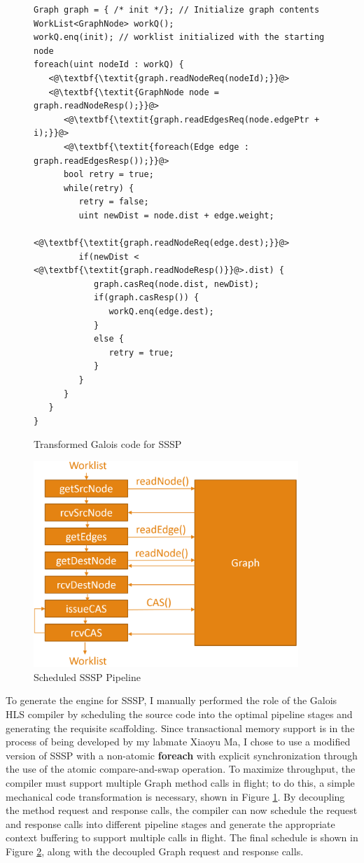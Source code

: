 \begin{figure}
\centering
\lstset{language=Java}
\begin{lstlisting}
Graph graph = { /* init */}; // Initialize graph contents
WorkList<GraphNode> workQ();
workQ.enq(init); // worklist initialized with the starting node
foreach(uint nodeId : workQ) {
   <@\textbf{\textit{graph.readNodeReq(nodeId);}}@>
   <@\textbf{\textit{GraphNode node = graph.readNodeResp();}}@>
      <@\textbf{\textit{graph.readEdgesReq(node.edgePtr + i);}}@>
      <@\textbf{\textit{foreach(Edge edge : graph.readEdgesResp());}}@>
      bool retry = true;
      while(retry) {
         retry = false;
         uint newDist = node.dist + edge.weight;
         <@\textbf{\textit{graph.readNodeReq(edge.dest);}}@>
         if(newDist < <@\textbf{\textit{graph.readNodeResp()}}@>.dist) {
            graph.casReq(node.dist, newDist);
            if(graph.casResp()) {
               workQ.enq(edge.dest);
            }
            else {
               retry = true;
            }
         }
      }
   }
}
\end{lstlisting}
\caption{Transformed Galois code for SSSP}
\label{fig:ssspSourceCASxform}
\end{figure}


\begin{figure}
\centering
\includegraphics[width=10cm, keepaspectratio]{pics/ssspEngine.png}
\caption{Scheduled SSSP Pipeline}
\label{fig:ssspEngine}
\end{figure}

To generate the engine for SSSP, I manually performed the role of the Galois HLS compiler by scheduling the source 
code into the optimal pipeline stages and generating the requisite scaffolding. Since transactional memory support is 
in the process of being developed by my labmate Xiaoyu Ma, I chose to use a modified version of SSSP with a 
non-atomic \textbf{foreach} with explicit synchronization through the use of the atomic compare-and-swap operation. 
To maximize throughput, the compiler must support multiple Graph method calls in flight; to do this, a simple 
mechanical code transformation is necessary, shown in Figure \ref{fig:ssspSourceCASxform}. By decoupling the method 
request and response calls, the compiler can now schedule the request and response calls into different pipeline 
stages and generate the appropriate context buffering to support multiple calls in flight. The final schedule is 
shown in Figure \ref{fig:ssspEngine}, along with the decoupled Graph request and response calls.

